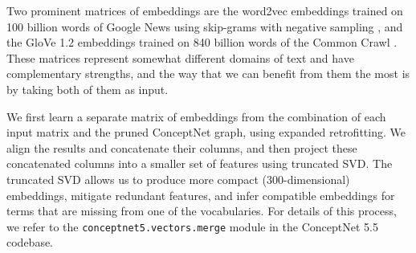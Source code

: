 \documentclass[letterpaper]{article}
\begin{document}
Two prominent matrices of embeddings are the word2vec embeddings trained on 100
billion words of Google News using skip-grams with negative sampling
\cite{mikolov2013word2vec}, and the GloVe 1.2 embeddings trained on 840 billion
words of the Common Crawl \cite{pennington2014glove}. These matrices represent
somewhat different domains of text and have complementary strengths, and the
way that we can benefit from them the most is by taking both of them as input.

We first learn a separate matrix of embeddings from the combination of each
input matrix and the pruned ConceptNet graph, using expanded retrofitting. We
align the results and concatenate their columns, and then project these
concatenated columns into a smaller set of features using truncated SVD. The
truncated SVD allows us to produce more compact (300-dimensional) embeddings,
mitigate redundant features, and infer compatible embeddings for terms that
are missing from one of the vocabularies. For details of this process, we
refer to the \texttt{conceptnet5.vectors.merge} module in the ConceptNet 5.5
codebase.



\end{document}
